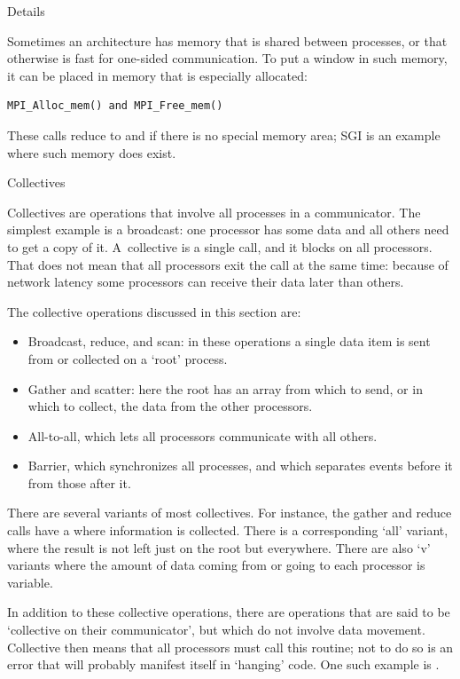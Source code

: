  {Details}
\label{sec:mpi-alloc}

Sometimes an architecture has memory that is shared between processes,
or that otherwise is fast for one-sided communication. To put a window
in such memory, it can be placed in memory that is especially
allocated:
\begin{verbatim}
MPI_Alloc_mem() and MPI_Free_mem()
\end{verbatim}
These calls reduce to  and  if there is no special
memory area; SGI is an example where such memory does exist.


 {Collectives}

Collectives are operations that involve all processes in a
communicator. The simplest example is a broadcast: one processor has
some data and all others need to get a copy of it.  A~collective is a
single call, and it blocks on all processors. That does not mean that
all processors exit the call at the same time: because of network
latency some processors can receive their data later than others.

The collective operations discussed in this section are:
\begin{itemize}
\item Broadcast, reduce, and scan: in these operations a single data
  item is sent from or collected on a `root' process.
\item Gather and scatter: here the root has an array from which to
  send, or in which to collect, the data from the other processors.
\item All-to-all, which lets all processors communicate with all others.
\item Barrier, which synchronizes all processes, and which separates
  events before it from those after it.
\end{itemize}
There are several variants of most collectives. For instance, the
gather and reduce calls have
a  where
information is collected.  There is a corresponding `all' variant,
where the result is not left just on the root but everywhere. 
There are also `v' variants where the
amount of data coming from or going to each processor is variable.

In addition to these collective operations, there are operations that
are said to be `collective on their communicator', but which do not
involve data movement. Collective then means that all processors must
call this routine; not to do so is an error that will probably
manifest itself in `hanging' code. One such example is
.

